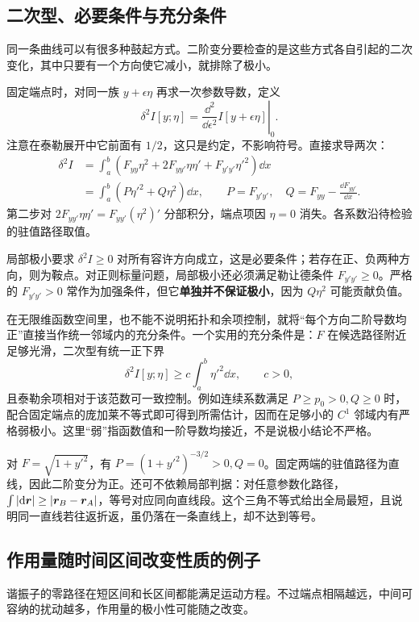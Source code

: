 \subsection{二次型、必要条件与充分条件}
同一条曲线可以有很多种鼓起方式。二阶变分要检查的是这些方式各自引起的二次变化，其中只要有一个方向使它减小，就排除了极小。

固定端点时，对同一族 $y+\epsilon\eta$ 再求一次参数导数，定义
\[
\delta^2 I[y;\eta]=\left.\frac{\dd^2}{\dd\epsilon^2}I[y+\epsilon\eta]\right|_0.
\]
注意在泰勒展开中它前面有 $1/2$，这只是约定，不影响符号。直接求导两次：
\begin{align}\label{eq:second-variation}
\delta^2 I
&=\int_a^b(F_{yy}\eta^2+2F_{yy'}\eta\eta'+F_{y'y'}\eta'^2)\dd x\nonumber\\
&=\int_a^b\left(P\eta'^2+Q\eta^2\right)\dd x,\qquad
P=F_{y'y'},\quad Q=F_{yy}-\frac{\dd F_{yy'}}{\dd x}.
\end{align}
第二步对 $2F_{yy'}\eta\eta'=F_{yy'}(\eta^2)'$ 分部积分，端点项因 $\eta=0$ 消失。各系数沿待检验的驻值路径取值。

局部极小要求 $\delta^2I\ge0$ 对所有容许方向成立，这是必要条件；若存在正、负两种方向，则为鞍点。对正则标量问题，局部极小还必须满足勒让德条件 $F_{y'y'}\ge0$。严格的 $F_{y'y'}>0$ 常作为加强条件，但它\textbf{单独并不保证极小}，因为 $Q\eta^2$ 可能贡献负值。

在无限维函数空间里，也不能不说明拓扑和余项控制，就将“每个方向二阶导数均正”直接当作统一邻域内的充分条件。一个实用的充分条件是：$F$ 在候选路径附近足够光滑，二次型有统一正下界
\[
\delta^2I[y;\eta]\ge c\int_a^b\eta'^2\dd x,\qquad c>0,
\]
且泰勒余项相对于该范数可一致控制。例如连续系数满足 $P\ge p_0>0,Q\ge0$ 时，配合固定端点的庞加莱不等式即可得到所需估计，因而在足够小的 $C^1$ 邻域内有严格弱极小。这里“弱”指函数值和一阶导数均接近，不是说极小结论不严格。

\begin{example}
对 $F=\sqrt{1+y'^2}$，有 $P=(1+y'^2)^{-3/2}>0,Q=0$。固定两端的驻值路径为直线，因此二阶变分为正。还可不依赖局部判据：对任意参数化路径，$\int|\mathrm{d}\boldsymbol{r}|\ge|\boldsymbol{r}_B-\boldsymbol{r}_A|$，等号对应同向直线段。这个三角不等式给出全局最短，且说明同一直线若往返折返，虽仍落在一条直线上，却不达到等号。
\end{example}

\subsection{作用量随时间区间改变性质的例子}
谐振子的零路径在短区间和长区间都能满足运动方程。不过端点相隔越远，中间可容纳的扰动越多，作用量的极小性可能随之改变。

